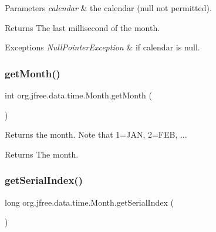 \begin{DoxyParams}{Parameters}
{\em calendar} & the calendar ({\ttfamily null} not permitted).\\
\hline
\end{DoxyParams}
\begin{DoxyReturn}{Returns}
The last millisecond of the month.
\end{DoxyReturn}

\begin{DoxyExceptions}{Exceptions}
{\em Null\+Pointer\+Exception} & if {\ttfamily calendar} is {\ttfamily null}. \\
\hline
\end{DoxyExceptions}
\mbox{\label{classorg_1_1jfree_1_1data_1_1time_1_1_month_ad9cb88584820021114002c786b8a1628}} 
\subsubsection{\texorpdfstring{get\+Month()}{getMonth()}}
{\footnotesize\ttfamily int org.\+jfree.\+data.\+time.\+Month.\+get\+Month (\begin{DoxyParamCaption}{ }\end{DoxyParamCaption})}

Returns the month. Note that 1=J\+AN, 2=F\+EB, ...

\begin{DoxyReturn}{Returns}
The month. 
\end{DoxyReturn}
\mbox{\label{classorg_1_1jfree_1_1data_1_1time_1_1_month_abb6ff67c83a4632db945b24bef2ab1b5}} 
\subsubsection{\texorpdfstring{get\+Serial\+Index()}{getSerialIndex()}}
{\footnotesize\ttfamily long org.\+jfree.\+data.\+time.\+Month.\+get\+Serial\+Index (\begin{DoxyParamCaption}{ }\end{DoxyParamCaption})}


